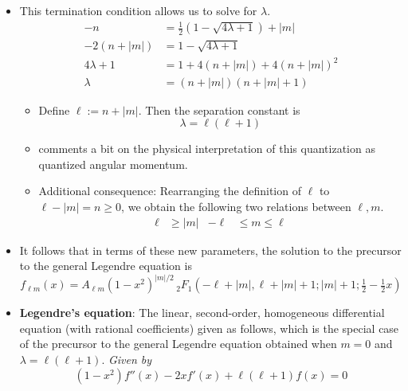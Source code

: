 \documentclass[../finalProject.tex]{subfiles}
\begin{document}
\begin{itemize}
\begin{itemize}
\begin{itemize}
\begin{proof}
            \end{proof}
        \end{itemize}
        \item In particular, $a$ being a nonpositive integer means that
        \begin{equation*}
            \tfrac{1}{2}(1-\sqrt{4\lambda+1})+|m| = a = -n\tag{$n=0,1,2,\dots$}
        \end{equation*}
        \begin{itemize}
            \item Note: Since $a=-n$ and $a+b=2|m|+1$, it also follows that $b=n+2|m|+1$.
        \end{itemize}
    \end{itemize}
    \item This termination condition allows us to solve for $\lambda$.
    \begin{align*}
        -n &= \tfrac{1}{2}(1-\sqrt{4\lambda+1})+|m|\\
        -2(n+|m|) &= 1-\sqrt{4\lambda+1}\\
        4\lambda+1 &= 1+4(n+|m|)+4(n+|m|)^2\\
        \lambda &= (n+|m|)(n+|m|+1)
    \end{align*}
    \begin{itemize}
        \item Define $\ell:=n+|m|$. Then the separation constant is
        \begin{equation*}
            \lambda = \ell(\ell+1)\tag{$\ell=0,1,2,\dots$}
        \end{equation*}
        \item \textcite{bib:Seaborn} comments a bit on the physical interpretation of this quantization as quantized angular momentum.
        \item Additional consequence: Rearranging the definition of $\ell$ to $\ell-|m|=n\geq 0$, we obtain the following two relations between $\ell,m$.
        \begin{align*}
            \ell &\geq |m|&
            -\ell &\leq m \leq \ell
        \end{align*}
    \end{itemize}
    \item It follows that in terms of these new parameters, the solution to the precursor to the general Legendre equation is
    \begin{equation*}
        f_{\ell m}(x) = A_{\ell m}(1-x^2)^{|m|/2}\,{}_2F_1(-\ell+|m|,\ell+|m|+1;|m|+1;\tfrac{1}{2}-\tfrac{1}{2}x)
    \end{equation*}
    \item \textbf{Legendre's equation}: The linear, second-order, homogeneous differential equation (with rational coefficients) given as follows, which is the special case of the precursor to the general Legendre equation obtained when $m=0$ and $\lambda=\ell(\ell+1)$. \emph{Given by}
    \begin{equation*}
        (1-x^2)f''(x)-2xf'(x)+\ell(\ell+1)f(x) = 0
    \end{equation*}
\end{itemize}
\end{document}
